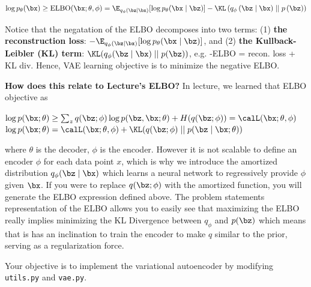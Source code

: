 \begin{equation} \label{eq:4}
    \log p_{\theta}(\bx) \ge \text{ELBO}(\bx; \theta, \phi) = \E_{q_{\phi}(\bz \mid \bx)} [\log p_{\theta}(\bx \mid \bz)] - \KL\left(q_{\phi}\left(\bz \mid \bx\right) \mid\mid p\left(\bz\right)\right)
\end{equation}

Notice that the negatation of the ELBO decomposes into two terms: (1) \textbf{the reconstruction loss}: $- \E_{q_{\phi}(\bz \mid \bx)}[\log p_{\theta}(\bx \mid \bz)]$, and 
(2) \textbf{the Kullback-Leibler (KL) term}: $\KL (q_{\phi}(\bz \mid \bx) \mid\mid p(\bz))$, e.g. -ELBO = recon. loss + KL div. Hence,
VAE learning objective is to minimize the negative ELBO.

\textbf{How does this relate to Lecture's ELBO?} In lecture, we learned that ELBO objective as 
\begin{center}
    $\log p(\bx; \theta) \ge \sum_{z}q(\bz; \phi) \log p(\bz, \bx; \theta) + H(q(\bz; \phi)) = \calL(\bx; \theta, \phi)$ \\
    $\log p(\bx; \theta) = \calL(\bx; \theta, \phi) + \KL(q(\bz; \phi) \mid\mid p(\bz \mid \bx; \theta))$
\end{center}

where $\theta$ is the decoder, $\phi$ is the encoder. However it is not scalable to define an encoder $\phi$ for each data point $x$,
which is why we introduce the amortized distribution $q_{\phi}(\bz \mid \bx)$ which learns a neural network to regressively provide $\phi$
given $\bx$. If you were to replace $q(\bz; \phi)$ with the amortized function, you will generate the ELBO expression defined above. The problem statements
representation of the ELBO allows you to easily see that maximizing the ELBO really implies minimizing the KL Divergence between $q_{\phi}$ and $p(\bz)$
which means that is has an inclination to train the encoder to make $q$ similar to the prior, serving as a regularization force.  

Your objective is to implement the variational autoencoder by modifying \texttt{utils.py} and \texttt{vae.py}.

